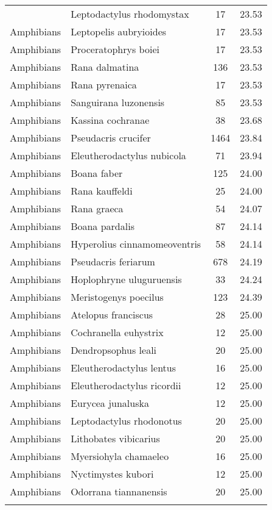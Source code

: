 \begin{longtable}{llcc}
{  Amphibians & Leptodactylus rhodomystax &  17 & 23.53 \\ 
  Amphibians & Leptopelis aubryioides &  17 & 23.53 \\ 
  Amphibians & Proceratophrys boiei &  17 & 23.53 \\ 
  Amphibians & Rana dalmatina & 136 & 23.53 \\ 
  Amphibians & Rana pyrenaica &  17 & 23.53 \\ 
  Amphibians & Sanguirana luzonensis &  85 & 23.53 \\ 
  Amphibians & Kassina cochranae &  38 & 23.68 \\ 
  Amphibians & Pseudacris crucifer & 1464 & 23.84 \\ 
  Amphibians & Eleutherodactylus nubicola &  71 & 23.94 \\ 
  Amphibians & Boana faber & 125 & 24.00 \\ 
  Amphibians & Rana kauffeldi &  25 & 24.00 \\ 
  Amphibians & Rana graeca &  54 & 24.07 \\ 
  Amphibians & Boana pardalis &  87 & 24.14 \\ 
  Amphibians & Hyperolius cinnamomeoventris &  58 & 24.14 \\ 
  Amphibians & Pseudacris feriarum & 678 & 24.19 \\ 
  Amphibians & Hoplophryne uluguruensis &  33 & 24.24 \\ 
  Amphibians & Meristogenys poecilus & 123 & 24.39 \\ 
  Amphibians & Atelopus franciscus &  28 & 25.00 \\ 
  Amphibians & Cochranella euhystrix &  12 & 25.00 \\ 
  Amphibians & Dendropsophus leali &  20 & 25.00 \\ 
  Amphibians & Eleutherodactylus lentus &  16 & 25.00 \\ 
  Amphibians & Eleutherodactylus ricordii &  12 & 25.00 \\ 
  Amphibians & Eurycea junaluska &  12 & 25.00 \\ 
  Amphibians & Leptodactylus rhodonotus &  20 & 25.00 \\ 
  Amphibians & Lithobates vibicarius &  20 & 25.00 \\ 
  Amphibians & Myersiohyla chamaeleo &  16 & 25.00 \\ 
  Amphibians & Nyctimystes kubori &  12 & 25.00 \\ 
  Amphibians & Odorrana tiannanensis &  20 & 25.00 \\ 
}
\end{longtable}
